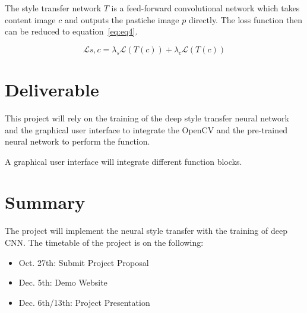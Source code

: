 \documentclass[11pt, a4paper]{article}
\begin{document}
The style transfer network $T$ is a feed-forward convolutional network which takes content image $c$ and outputs the pastiche image $p$ directly. The loss function then can be reduced to equation~\ref{eq:eq4}.

\begin{equation}
\label{eq:eq4}
\mathcal{L}{s,c} = \lambda_{s}\mathcal{L}(T(c)) + \lambda_{c}\mathcal{L}(T(c)) 
\end{equation} 
 
\section{Deliverable}

This project will rely on the training of the deep style transfer neural network and the graphical user interface to integrate the OpenCV and the pre-trained neural network to perform the function. 

A graphical user interface will integrate different function blocks.


\section{Summary}

The project will implement the neural style transfer with the training of deep CNN. The timetable of the project is on the following:

\begin{itemize}
\item Oct. 27th: Submit Project Proposal 
\item Dec. 5th: Demo Website 
\item Dec. 6th/13th: Project Presentation
\end{itemize}





\newpage
  
 





\end{document}

